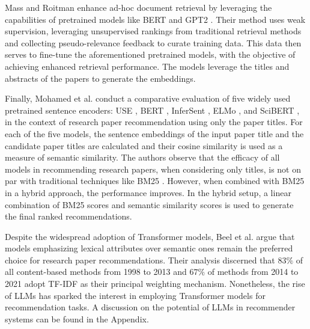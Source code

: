 Mass and Roitman \cite{MassAdhocDocument2020} enhance ad-hoc document retrieval by leveraging the capabilities of pretrained models like BERT \cite{DevlinBERTPretraining2019} and GPT2 \cite{RadfordLanguageModels2018}. Their method uses weak supervision, leveraging unsupervised rankings from traditional retrieval methods and collecting pseudo-relevance feedback to curate training data. This data then serves to fine-tune the aforementioned pretrained models, with the objective of achieving enhanced retrieval performance. The models leverage the titles and abstracts of the papers to generate the embeddings.

Finally, Mohamed et al. \cite{A.MohamedBERTELMo2019} conduct a comparative evaluation of five widely used pretrained sentence encoders: USE \cite{CerUniversalSentence2018}, BERT \cite{DevlinBERTPretraining2019}, InferSent \cite{ConneauSupervisedLearning2018}, ELMo \cite{PetersDeepContextualized2018}, and SciBERT \cite{BeltagySciBERTPretrained2019}, in the context of research paper recommendation using only the paper titles. For each of the five models, the sentence embeddings of the input paper title and the candidate paper titles are calculated and their cosine similarity is used as a measure of semantic similarity. The authors observe that the efficacy of all models in recommending research papers, when considering only titles, is not on par with traditional techniques like BM25 \cite{RobertsonOkapiTREC31995}. However, when combined with BM25 in a hybrid approach, the performance improves.
In the hybrid setup, a linear combination of BM25 scores and semantic similarity scores is used to generate the final ranked recommendations.

Despite the widespread adoption of Transformer models, Beel et al. \cite{BeelResearchpaperRecommender2016} argue that models emphasizing lexical attributes over semantic ones remain the preferred choice for research paper recommendations. Their analysis discerned that $83\%$ of all content-based methods from 1998 to 2013 and $67\%$ of methods from 2014 to 2021 adopt TF-IDF as their principal weighting mechanism.
Nonetheless, the rise of \ac{LLMs} has sparked the interest in employing Transformer models for recommendation tasks. A discussion on the potential of \ac{LLMs} in recommender systems can be found in the Appendix.
